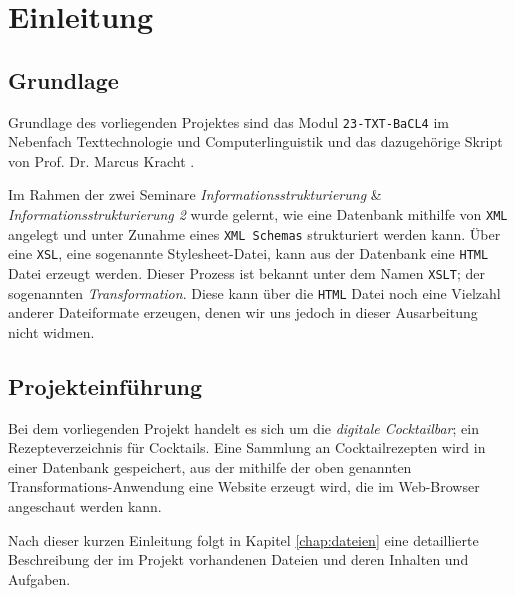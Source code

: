 \chapter{Einleitung}
\label{chap:einleitung}


\section{Grundlage}

Grundlage des vorliegenden Projektes sind das Modul \texttt{23-TXT-BaCL4} im Nebenfach Texttechnologie und Computerlinguistik und das dazugehörige Skript von Prof. Dr. Marcus Kracht \cite{kracht2018}.

Im Rahmen der zwei Seminare \textit{Informationsstrukturierung} \& \textit{Informationsstrukturierung 2} wurde gelernt, wie eine Datenbank mithilfe von \texttt{XML} angelegt und unter Zunahme eines \texttt{XML Schemas} strukturiert werden kann. Über eine \texttt{XSL}, eine sogenannte Stylesheet-Datei, kann aus der Datenbank eine \texttt{HTML} Datei erzeugt werden. Dieser Prozess ist bekannt unter dem Namen \texttt{XSLT}; der sogenannten \textit{Transformation}. Diese kann über die \texttt{HTML} Datei noch eine Vielzahl anderer Dateiformate erzeugen, denen wir uns jedoch in dieser Ausarbeitung nicht widmen.

\section{Projekteinführung}

Bei dem vorliegenden Projekt handelt es sich um die \textit{digitale Cocktailbar}; ein Rezepteverzeichnis für Cocktails. Eine Sammlung an Cocktailrezepten wird in einer Datenbank gespeichert, aus der mithilfe der oben genannten Transformations-Anwendung eine Website erzeugt wird, die im Web-Browser angeschaut werden kann.

Nach dieser kurzen Einleitung folgt in Kapitel \ref{chap:dateien} eine detaillierte Beschreibung der im Projekt vorhandenen Dateien und deren Inhalten und Aufgaben.


